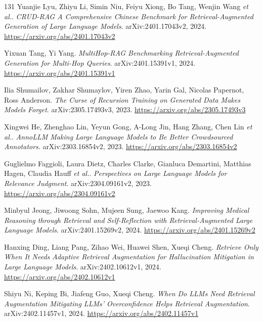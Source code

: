 \documentclass[11pt,a4paper]{article}
\begin{document}
\begin{thebibliography}{131}
Yuanjie Lyu, Zhiyu Li, Simin Niu, Feiyu Xiong, Bo Tang, Wenjin Wang \emph{et al.}.
\newblock \emph{CRUD-RAG A Comprehensive Chinese Benchmark for Retrieval-Augmented Generation of Large Language Models}.
\newblock arXiv:2401.17043v2, 2024.
\newblock \url{https://arxiv.org/abs/2401.17043v2}

Yixuan Tang, Yi Yang.
\newblock \emph{MultiHop-RAG Benchmarking Retrieval-Augmented Generation for Multi-Hop Queries}.
\newblock arXiv:2401.15391v1, 2024.
\newblock \url{https://arxiv.org/abs/2401.15391v1}

Ilia Shumailov, Zakhar Shumaylov, Yiren Zhao, Yarin Gal, Nicolas Papernot, Ross Anderson.
\newblock \emph{The Curse of Recursion Training on Generated Data Makes Models Forget}.
\newblock arXiv:2305.17493v3, 2023.
\newblock \url{https://arxiv.org/abs/2305.17493v3}

Xingwei He, Zhenghao Lin, Yeyun Gong, A-Long Jin, Hang Zhang, Chen Lin \emph{et al.}.
\newblock \emph{AnnoLLM Making Large Language Models to Be Better Crowdsourced Annotators}.
\newblock arXiv:2303.16854v2, 2023.
\newblock \url{https://arxiv.org/abs/2303.16854v2}

Guglielmo Faggioli, Laura Dietz, Charles Clarke, Gianluca Demartini, Matthias Hagen, Claudia Hauff \emph{et al.}.
\newblock \emph{Perspectives on Large Language Models for Relevance Judgment}.
\newblock arXiv:2304.09161v2, 2023.
\newblock \url{https://arxiv.org/abs/2304.09161v2}

Minbyul Jeong, Jiwoong Sohn, Mujeen Sung, Jaewoo Kang.
\newblock \emph{Improving Medical Reasoning through Retrieval and Self-Reflection with Retrieval-Augmented Large Language Models}.
\newblock arXiv:2401.15269v2, 2024.
\newblock \url{https://arxiv.org/abs/2401.15269v2}

Hanxing Ding, Liang Pang, Zihao Wei, Huawei Shen, Xueqi Cheng.
\newblock \emph{Retrieve Only When It Needs Adaptive Retrieval Augmentation for Hallucination Mitigation in Large Language Models}.
\newblock arXiv:2402.10612v1, 2024.
\newblock \url{https://arxiv.org/abs/2402.10612v1}

Shiyu Ni, Keping Bi, Jiafeng Guo, Xueqi Cheng.
\newblock \emph{When Do LLMs Need Retrieval Augmentation Mitigating LLMs' Overconfidence Helps Retrieval Augmentation}.
\newblock arXiv:2402.11457v1, 2024.
\newblock \url{https://arxiv.org/abs/2402.11457v1}


\end{thebibliography}
\end{document}
